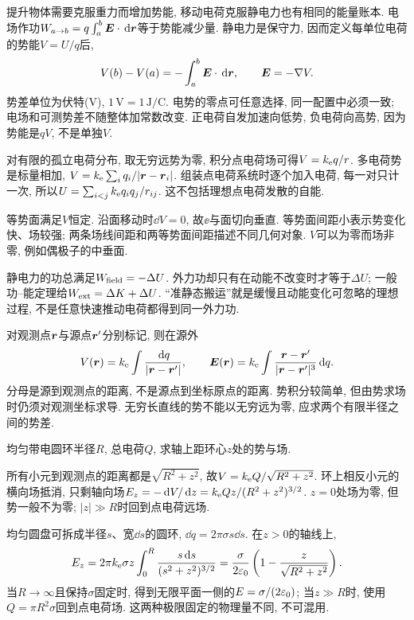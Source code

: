 \label{ch:potential}
提升物体需要克服重力而增加势能, 移动电荷克服静电力也有相同的能量账本. 电场作功$W_{a\to b}=q\int_a^b\boldsymbol{E}\cdot\,\mathrm d\boldsymbol{r}$等于势能减少量. 静电力是保守力, 因而定义每单位电荷的势能$V=U/q$后,
\[
V(b)-V(a)=-\int_a^b\boldsymbol{E}\cdot\,\mathrm d\boldsymbol{r},\qquad \boldsymbol{E}=-\nabla V.
\]
势差单位为伏特(V), $1\,\mathrm V=1\,\mathrm{J/C}$. 电势的零点可任意选择, 同一配置中必须一致; 电场和可测势差不随整体加常数改变. 正电荷自发加速向低势, 负电荷向高势, 因为势能是$qV$, 不是单独$V$.

对有限的孤立电荷分布, 取无穷远势为零, 积分点电荷场可得$V=k_{\mathrm e} q/r$. 多电荷势是标量相加, $V=k_{\mathrm e}\sum_i q_i/|\boldsymbol{r}-\boldsymbol{r}_i|$. 组装点电荷系统时逐个加入电荷, 每一对只计一次, 所以$U=\sum_{i<j}k_{\mathrm e} q_iq_j/r_{ij}$. 这不包括理想点电荷发散的自能.

等势面满足$V$恒定. 沿面移动时$\dd V=0$, 故$\ee$与面切向垂直. 等势面间距小表示势变化快、场较强; 两条场线间距和两等势面间距描述不同几何对象. $V$可以为零而场非零, 例如偶极子的中垂面.

静电力的功总满足$W_{\rm field}=-\Delta U$. 外力功却只有在动能不改变时才等于$\Delta U$; 一般功--能定理给$W_{\rm ext}=\Delta K+\Delta U$. “准静态搬运”就是缓慢且动能变化可忽略的理想过程, 不是任意快速推动电荷都得到同一外力功.

对观测点$\boldsymbol{r}$与源点$\boldsymbol{r}'$分别标记, 则在源外
\[
V(\boldsymbol{r})=k_{\mathrm e}\int\frac{\,\mathrm d q}{|\boldsymbol{r}-\boldsymbol{r}'|},\qquad
\boldsymbol{E}(\boldsymbol{r})=k_{\mathrm e}\int\frac{\boldsymbol{r}-\boldsymbol{r}'}{|\boldsymbol{r}-\boldsymbol{r}'|^3}\,\mathrm d q.
\]
分母是源到观测点的距离, 不是源点到坐标原点的距离. 势积分较简单, 但由势求场时仍须对观测坐标求导. 无穷长直线的势不能以无穷远为零, 应求两个有限半径之间的势差.

\begin{example}
均匀带电圆环半径$R$, 总电荷$Q$, 求轴上距环心$z$处的势与场.
\end{example}
\begin{solution}
所有小元到观测点的距离都是$\sqrt{R^2+z^2}$, 故$V=k_{\mathrm e} Q/\sqrt{R^2+z^2}$. 环上相反小元的横向场抵消, 只剩轴向场$E_z=-\,\mathrm d V/\,\mathrm d z=k_{\mathrm e} Qz/(R^2+z^2)^{3/2}$. $z=0$处场为零, 但势一般不为零; $|z|\gg R$时回到点电荷远场.
\end{solution}

均匀圆盘可拆成半径$s$、宽$\dd s$的圆环, $\dd q=2\pi\sigma s\dd s$. 在$z>0$的轴线上,
\[
E_z=2\pi k_{\mathrm e}\sigma z\int_0^R\frac{s\,\mathrm d s}{(s^2+z^2)^{3/2}}
=\frac\sigma{2\varepsilon_0}\left(1-\frac z{\sqrt{R^2+z^2}}\right).
\]
当$R\to\infty$且保持$\sigma$固定时, 得到无限平面一侧的$E=\sigma/(2\varepsilon_0)$; 当$z\gg R$时, 使用$Q=\pi R^2\sigma$回到点电荷场. 这两种极限固定的物理量不同, 不可混用.


